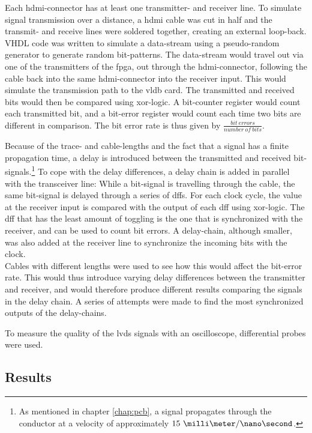 \documentclass[main.tex]{subfiles}
\begin{document}
Each \gls{hdmi}-connector has at least one transmitter- and receiver line. To simulate signal transmission over a distance, a \gls{hdmi} cable was cut in half and the transmit- and receive lines were soldered together, creating an external loop-back. VHDL code was written to simulate a data-stream using a pseudo-random generator to generate random bit-patterns. The data-stream would travel out via one of the transmitters of the \gls{fpga}, out through the \gls{hdmi}-connector, following the cable back into the same \gls{hdmi}-connector into the receiver input. This would simulate the transmission path to the \gls{vldb} card. The transmitted and received bits would then be compared using xor-logic. A bit-counter register would count each transmitted bit, and a bit-error register would count each time two bits are different in comparison. The bit error rate is thus given by $\frac{bit~errors}{number~of~bits}$.

Because of the trace- and cable-lengths and the fact that a signal has a finite propagation time, a delay is introduced between the transmitted and received bit-signals.\footnote{As mentioned in chapter \ref{chap:pcb}, a signal propagates through the conductor at a velocity of approximately $15\ \milli\meter/\nano\second$.} To cope with the delay differences, a delay chain is added in parallel with the transceiver line: While a bit-signal is travelling through the cable, the same bit-signal is delayed through a series of \glspl{dff}. For each clock cycle, the value at the receiver input is compared with the output of each \gls{dff} using xor-logic. The \gls{dff} that has the least amount of toggling is the one that is synchronized with the receiver, and can be used to count bit errors. A delay-chain, although smaller, was also added at the receiver line to synchronize the incoming bits with the clock.
\\

Cables with different lengths were used to see how this would affect the bit-error rate. This would thus introduce varying delay differences between the transmitter and receiver, and would therefore produce different results comparing the signals in the delay chain. A series of attempts were made to find the most synchronized outputs of the delay-chains. 

To measure the quality of the \gls{lvds} signals with an oscilloscope, differential probes were used.  


\subsection{Results}
\end{document}
